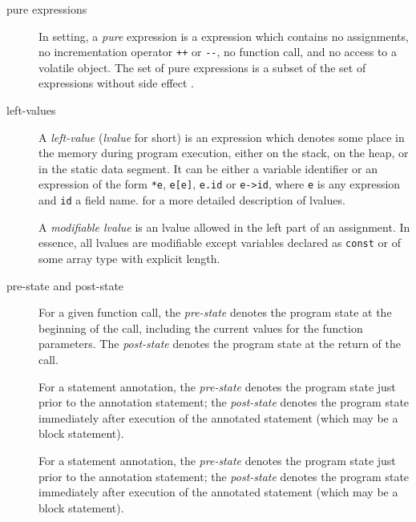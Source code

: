 \documentclass{frama-c-book}
\begin{document}
\begin{description}
\item[pure expressions]  In \NAME setting, a
  \emph{pure} expression is a \lang expression which contains no assignments, no
  incrementation operator \lstinline|++| or \lstinline|--|, no function call,
  and no access to a volatile object. The set of pure expressions is a
  subset of the set of \lang expressions without side effect
  \iftoggle{isCPP}
  {(C++ standard~\cite{C++-2011}, \S 1.9, [intro.execution], alinea 2)}
  {(C standard~\cite{KR88,standardc99}, \S 5.1.2.3, alinea 2)}.

\item[left-values] 

  A \emph{left-value} (\emph{lvalue} for short) is an expression which
  denotes some place in the memory during program execution, either on
  the stack, on the heap, or in the static data segment. It can be
  either a variable identifier or an expression of the form \lstinline|*e|,
  \lstinline|e[e]|, \lstinline|e.id| or \lstinline|e->id|, where
  \lstinline |e| is any expression and \lstinline|id| a field name.
  \iftoggle{isCPP}
  {See C++ standard, \S 3.10 [basic.lval]}
  {See C standard, \S 6.3.2.1}
  for a more detailed description of lvalues.

  A \emph{modifiable lvalue} is an lvalue allowed in the left part of
  an assignment. In essence, all lvalues are modifiable except
  variables declared as \texttt{const} or of some array type with
  explicit length.

\item[pre-state and post-state]

    For a given function call, the \emph{pre-state} denotes the
    program state at the beginning of the call, including the
    current values for the function parameters. The \emph{post-state}
    denotes the program state at the return of the call.

    For a statement annotation, the \emph{pre-state} denotes the
    program state just prior to the annotation statement; the
    \emph{post-state}
    denotes the program state immediately after execution of the annotated statement (which may be a block statement).

    For a statement annotation, the \emph{pre-state} denotes the
    program state just prior to the annotation statement; the
    \emph{post-state}
    denotes the program state immediately after execution of the annotated statement (which may be a block statement).


\end{description}
\end{document}

